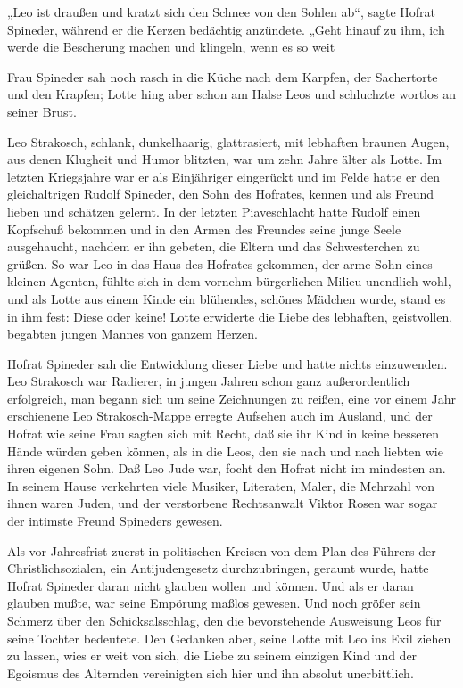 „Leo ist draußen und kratzt sich den Schnee von den Sohlen ab“,
sagte Hofrat Spineder, während er die Kerzen bedächtig anzündete.
„Geht hinauf zu ihm, ich werde die Bescherung machen und klingeln,
wenn es so weit 

Frau Spineder sah noch rasch in die Küche nach dem
Karpfen, der Sachertorte und den Krapfen; Lotte hing aber schon am
Halse Leos und schluchzte wortlos an seiner Brust.

Leo Strakosch, schlank, dunkelhaarig, glattrasiert, mit lebhaften
braunen Augen, aus denen Klugheit und Humor blitzten, war um zehn
Jahre älter als Lotte. Im letzten Kriegsjahre war er als
Einjähriger eingerückt und im Felde hatte er den gleichaltrigen
Rudolf Spineder, den Sohn des Hofrates, kennen und als Freund
lieben und schätzen gelernt. In der letzten Piaveschlacht hatte
Rudolf einen Kopfschuß bekommen und in den Armen des Freundes seine
junge Seele ausgehaucht, nachdem er ihn gebeten, die Eltern und das
Schwesterchen zu grüßen. So war Leo in das Haus des Hofrates
gekommen, der arme Sohn eines kleinen Agenten, fühlte sich in dem
vornehm-bürgerlichen Milieu unendlich wohl, und als Lotte aus einem
Kinde ein blühendes, schönes Mädchen wurde, stand es in ihm fest:
Diese oder keine! Lotte erwiderte die Liebe des lebhaften,
geistvollen, begabten jungen Mannes von ganzem Herzen.

Hofrat Spineder sah die Entwicklung dieser Liebe und hatte nichts
einzuwenden. Leo Strakosch war Radierer, in jungen Jahren schon
ganz außerordentlich erfolgreich, man begann sich um seine
Zeichnungen zu reißen, eine vor einem Jahr erschienene Leo
Strakosch-Mappe erregte Aufsehen auch im Ausland, und der Hofrat
wie seine Frau sagten sich mit Recht, daß sie ihr Kind in keine
besseren Hände würden geben können, als in die Leos, den sie nach
und  nach liebten wie ihren eigenen Sohn. Daß Leo
Jude war, focht den Hofrat nicht im mindesten an. In seinem Hause
verkehrten viele Musiker, Literaten, Maler, die Mehrzahl von ihnen
waren Juden, und der verstorbene Rechtsanwalt Viktor Rosen war
sogar der intimste Freund Spineders gewesen.

Als vor Jahresfrist zuerst in politischen Kreisen von dem Plan des
Führers der Christlichsozialen, ein Antijudengesetz durchzubringen,
geraunt wurde, hatte Hofrat Spineder daran nicht glauben wollen und
können. Und als er daran glauben mußte, war seine Empörung maßlos
gewesen. Und noch größer sein Schmerz über den Schicksalsschlag,
den die bevorstehende Ausweisung Leos für seine Tochter bedeutete.
Den Gedanken aber, seine Lotte mit Leo ins Exil ziehen zu lassen,
wies er weit von sich, die Liebe zu seinem einzigen Kind und der
Egoismus des Alternden vereinigten sich hier und
 ihn absolut unerbittlich.

